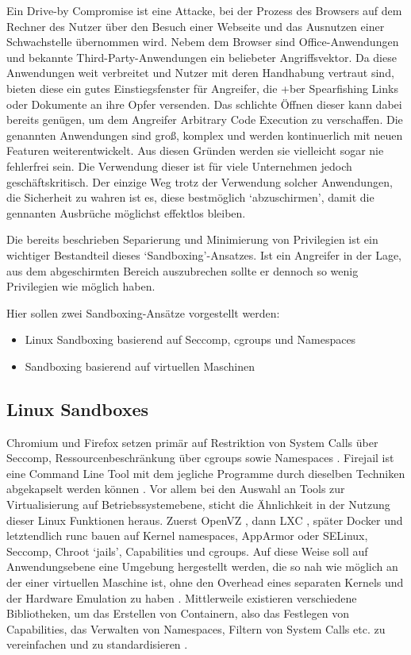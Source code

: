Ein Drive-by Compromise ist eine Attacke, bei der Prozess des Browsers auf dem Rechner des Nutzer über den Besuch einer Webseite und das Ausnutzen einer Schwachstelle übernommen wird. Nebem dem Browser sind Office-Anwendungen und bekannte Third-Party-Anwendungen ein beliebeter Angriffsvektor. Da diese Anwendungen weit verbreitet und Nutzer mit deren Handhabung vertraut sind, bieten diese ein gutes Einstiegsfenster für Angreifer, die +ber Spearfishing Links oder Dokumente an ihre Opfer
versenden. Das schlichte Öffnen dieser kann dabei bereits genügen, um dem Angreifer Arbitrary Code Execution zu verschaffen. Die genannten Anwendungen sind groß, komplex und werden kontinuerlich mit neuen Featuren weiterentwickelt. Aus diesen Gründen werden sie vielleicht sogar nie fehlerfrei sein. Die Verwendung dieser ist für viele Unternehmen jedoch geschäftskritisch. Der einzige Weg trotz der Verwendung solcher Anwendungen, die Sicherheit zu wahren ist es, diese bestmöglich
`abzuschirmen', damit die gennanten Ausbrüche möglichst effektlos bleiben.

Die bereits beschrieben Separierung und Minimierung von Privilegien ist ein wichtiger Bestandteil dieses `Sandboxing'-Ansatzes. Ist ein Angreifer in der Lage, aus dem abgeschirmten Bereich auszubrechen sollte er dennoch so wenig Privilegien wie möglich haben.

Hier sollen zwei Sandboxing-Ansätze vorgestellt werden: 

\begin{itemize}
    \item Linux Sandboxing basierend auf Seccomp, cgroups und Namespaces
    \item Sandboxing basierend auf virtuellen Maschinen
\end{itemize}

\subsection{Linux Sandboxes}

Chromium und Firefox setzen primär auf Restriktion von System Calls über Seccomp, Ressourcenbeschränkung über cgroups sowie Namespaces \cite{firefox-sandbox, chromium-sandbox}. Firejail ist eine Command Line Tool mit dem jegliche Programme durch dieselben Techniken abgekapselt werden können \cite{firejail}.
Vor allem bei den Auswahl an Tools zur Virtualisierung auf Betriebssystemebene, sticht die Ähnlichkeit in der Nutzung dieser Linux Funktionen heraus. Zuerst OpenVZ \cite{openvz}, dann LXC
\cite{lxc}, später Docker \cite{docker} und letztendlich runc \cite{runc} bauen auf Kernel namespaces, AppArmor oder SELinux, Seccomp, Chroot `jails', Capabilities und cgroups. Auf diese Weise soll auf Anwendungsebene eine Umgebung hergestellt werden, die so nah wie möglich an der einer virtuellen Maschine ist, ohne den Overhead eines separaten Kernels und der Hardware Emulation zu haben \cite{lxc}.
Mittlerweile existieren verschiedene Bibliotheken, um das Erstellen von Containern, also das Festlegen von Capabilities, das Verwalten von Namespaces, Filtern von System Calls etc. zu vereinfachen und zu standardisieren \cite{libvirt-lxc, systemd-nspawn, runc-libcontainer}.

